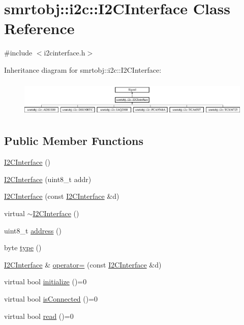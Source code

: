 \hypertarget{classsmrtobj_1_1i2c_1_1_i2_c_interface}{}\section{smrtobj\+:\+:i2c\+:\+:I2\+C\+Interface Class Reference}
\label{classsmrtobj_1_1i2c_1_1_i2_c_interface}


{\ttfamily \#include $<$i2cinterface.\+h$>$}

Inheritance diagram for smrtobj\+:\+:i2c\+:\+:I2\+C\+Interface\+:\begin{figure}[H]
\begin{center}
\leavevmode
\includegraphics[height=1.772152cm]{classsmrtobj_1_1i2c_1_1_i2_c_interface}
\end{center}
\end{figure}
\subsection*{Public Member Functions}
\begin{DoxyCompactItemize}
\item 
\hyperlink{classsmrtobj_1_1i2c_1_1_i2_c_interface_ad28b942fde042a2231c02c961d50d486}{I2\+C\+Interface} ()
\item 
\hyperlink{classsmrtobj_1_1i2c_1_1_i2_c_interface_acad278c8a4b9c1794cdd1dce56fd93e4}{I2\+C\+Interface} (uint8\+\_\+t addr)
\item 
\hyperlink{classsmrtobj_1_1i2c_1_1_i2_c_interface_a9b21318916efb375e0af0bd475582667}{I2\+C\+Interface} (const \hyperlink{classsmrtobj_1_1i2c_1_1_i2_c_interface}{I2\+C\+Interface} \&d)
\item 
virtual \hyperlink{classsmrtobj_1_1i2c_1_1_i2_c_interface_a280499b65bc92b621239891132e47c2e}{$\sim$\+I2\+C\+Interface} ()
\item 
uint8\+\_\+t \hyperlink{classsmrtobj_1_1i2c_1_1_i2_c_interface_ab2130ffa3db4c06e503cfb4af06bb6ef}{address} ()
\item 
byte \hyperlink{classsmrtobj_1_1i2c_1_1_i2_c_interface_a87b9e2a2f654a34aaa37ded12d8a1501}{type} ()
\item 
\hyperlink{classsmrtobj_1_1i2c_1_1_i2_c_interface}{I2\+C\+Interface} \& \hyperlink{classsmrtobj_1_1i2c_1_1_i2_c_interface_a6187a562fce82125fd97c0b4643b9120}{operator=} (const \hyperlink{classsmrtobj_1_1i2c_1_1_i2_c_interface}{I2\+C\+Interface} \&d)
\item 
virtual bool \hyperlink{classsmrtobj_1_1i2c_1_1_i2_c_interface_a4ff1ff083d877c7c0816299b11965eb4}{initialize} ()=0
\item 
virtual bool \hyperlink{classsmrtobj_1_1i2c_1_1_i2_c_interface_a33fd37bafaf8c7e8184acb6470322bce}{is\+Connected} ()=0
\item 
virtual bool \hyperlink{classsmrtobj_1_1i2c_1_1_i2_c_interface_a58bc734662a60de6a7cb7976c2179753}{read} ()=0
\end{DoxyCompactItemize}
